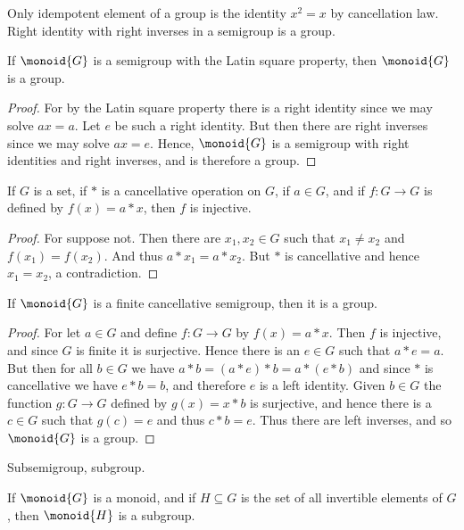         Only idempotent element of a group is the identity $x^{2}=x$ by
        cancellation law. Right identity with right inverses in a semigroup
        is a group.
        \begin{theorem}
            If $\monoid{G}$ is a semigroup with the Latin square property,
            then $\monoid{G}$ is a group.
        \end{theorem}
        \begin{proof}
            For by the Latin square property there is a right identity since
            we may solve $ax=a$. Let $e$ be such a right identity. But then
            there are right inverses since we may solve $ax=e$. Hence,
            $\monoid{G}$ is a semigroup with right identities and right
            inverses, and is therefore a group.
        \end{proof}
        \begin{theorem}
            If $G$ is a set, if $*$ is a cancellative operation on $G$,
            if $a\in{G}$, and if $f:G\rightarrow{G}$ is defined by
            $f(x)=a*x$, then $f$ is injective.
        \end{theorem}
        \begin{proof}
            For suppose not. Then there are $x_{1},x_{2}\in{G}$ such that
            $x_{1}\ne{x}_{2}$ and $f(x_{1})=f(x_{2})$. And thus
            $a*x_{1}=a*x_{2}$. But $*$ is cancellative and hence
            $x_{1}=x_{2}$, a contradiction.
        \end{proof}
        \begin{theorem}
            If $\monoid{G}$ is a finite cancellative semigroup, then it is
            a group.
        \end{theorem}
        \begin{proof}
            For let $a\in{G}$ and define $f:G\rightarrow{G}$ by
            $f(x)=a*x$. Then $f$ is injective, and since $G$ is finite it is
            surjective. Hence there is an $e\in{G}$ such that $a*e=a$. But
            then for all $b\in{G}$ we have $a*b=(a*e)*b=a*(e*b)$ and since
            $*$ is cancellative we have $e*b=b$, and therefore $e$ is a
            left identity. Given $b\in{G}$ the function $g:G\rightarrow{G}$
            defined by $g(x)=x*b$ is surjective, and hence there is a
            $c\in{G}$ such that $g(c)=e$ and thus $c*b=e$. Thus there are
            left inverses, and so $\monoid{G}$ is a group.
        \end{proof}
        Subsemigroup, subgroup.
        \begin{theorem}
            If $\monoid{G}$ is a monoid, and if $H\subseteq{G}$ is the set
            of all invertible elements of $G$, then $\monoid{H}$ is a
            subgroup.
        \end{theorem}
